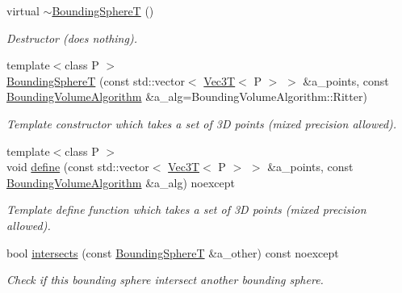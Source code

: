 \begin{DoxyCompactItemize}
virtual \hyperlink{classEBGeometry_1_1BoundingVolumes_1_1BoundingSphereT_a06db6d4588098bda148376ee71f51b91}{$\sim$\+Bounding\+SphereT} ()
\begin{DoxyCompactList}\small\item\em Destructor (does nothing). \end{DoxyCompactList}\item 
{\footnotesize template$<$class P $>$ }\\\hyperlink{classEBGeometry_1_1BoundingVolumes_1_1BoundingSphereT_ad780b67034525d145508a13f8b324546}{Bounding\+SphereT} (const std\+::vector$<$ \hyperlink{classVec3T}{Vec3T}$<$ P $>$ $>$ \&a\+\_\+points, const \hyperlink{classEBGeometry_1_1BoundingVolumes_1_1BoundingSphereT_ae80a2de96c8230589e4ea05fa9943946}{Bounding\+Volume\+Algorithm} \&a\+\_\+alg=Bounding\+Volume\+Algorithm\+::\+Ritter)
\begin{DoxyCompactList}\small\item\em Template constructor which takes a set of 3D points (mixed precision allowed). \end{DoxyCompactList}\item 
{\footnotesize template$<$class P $>$ }\\void \hyperlink{classEBGeometry_1_1BoundingVolumes_1_1BoundingSphereT_a95068b84f4ad5867c5d3a1034eb51f6f}{define} (const std\+::vector$<$ \hyperlink{classVec3T}{Vec3T}$<$ P $>$ $>$ \&a\+\_\+points, const \hyperlink{classEBGeometry_1_1BoundingVolumes_1_1BoundingSphereT_ae80a2de96c8230589e4ea05fa9943946}{Bounding\+Volume\+Algorithm} \&a\+\_\+alg) noexcept
\begin{DoxyCompactList}\small\item\em Template define function which takes a set of 3D points (mixed precision allowed). \end{DoxyCompactList}\item 
bool \hyperlink{classEBGeometry_1_1BoundingVolumes_1_1BoundingSphereT_af3a1030fd3e2cd2d3c86c95460781410}{intersects} (const \hyperlink{classEBGeometry_1_1BoundingVolumes_1_1BoundingSphereT}{Bounding\+SphereT} \&a\+\_\+other) const noexcept
\begin{DoxyCompactList}\small\item\em Check if this bounding sphere intersect another bounding sphere. \end{DoxyCompactList}\item 
\mbox{\label{classEBGeometry_1_1BoundingVolumes_1_1BoundingSphereT_a34a34d9da724336de6806ff607aed061}} 

\end{DoxyCompactItemize}
